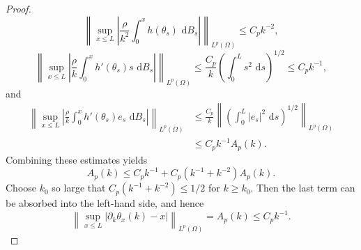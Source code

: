 \documentclass[11pt]{article}
\newcommand{\dd}{\,\mathrm d}
\begin{document}
\begin{proof}
\[
    \left\|\sup_{x\le L}\left|\frac{\rho}{k^2}\int_0^x h(\theta_s)\,\dd B_s\right|\right\|_{L^p(\Omega)}
    \le C_p k^{-2},
\]
\[
    \left\|\sup_{x\le L}\left|\frac{\rho}{k}\int_0^x h'(\theta_s)s\,\dd B_s\right|\right\|_{L^p(\Omega)}
    \le \frac{C_p}{k}\left(\int_0^L s^2\,\dd s\right)^{1/2}
    \le C_p k^{-1},
\]
and
\[
\begin{aligned}
    \left\|\sup_{x\le L}\left|\frac{\rho}{k}\int_0^x h'(\theta_s)e_s\,\dd B_s\right|\right\|_{L^p(\Omega)}
    &\le \frac{C_p}{k}
      \left\|\left(\int_0^L |e_s|^2\,\dd s\right)^{1/2}\right\|_{L^p(\Omega)}  \\
    &\le C_p k^{-1}A_p(k).
\end{aligned}
\]
Combining these estimates yields
\[
    A_p(k)\le C_p k^{-1}+C_p(k^{-1}+k^{-2})A_p(k).
\]
Choose $k_0$ so large that $C_p(k^{-1}+k^{-2})\le1/2$ for $k\ge k_0$. Then the last term can be absorbed into the left-hand side, and hence
\begin{equation}\label{eq:e-fixed-bound}
    \left\|\sup_{x\le L}|\partial_k\theta_x(k)-x|\right\|_{L^p(\Omega)}
    =A_p(k)
    \le C_p k^{-1}.
\end{equation}


\end{proof}
\end{document}
